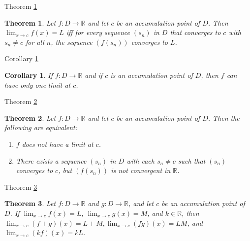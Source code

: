\documentclass[avery5371,grid]{flashcards}
\newtheorem{corollary}{Corollary}
\newtheorem{theorem}{Theorem}
\newcommand{\bb}[1]{\mathbb{#1}}
\newcommand{\R}{\bb{R}}
\begin{document}
\begin{flashcard}[Theorem]{Theorem \ref{thm66}}
\begin{theorem}
\label{thm66}
Let $f: D \to \R$ and let $c$ be an accumulation point of $D$.  Then
$\lim _{x \to c} f(x) = L$ iff for every sequence $(s_n)$ in $D$ that
converges to $c$ with $s_n \not= c$ for all $n$, the sequence $(f(s_n))$
converges to $L$.
\end{theorem}
\end{flashcard}

\begin{flashcard}[Corollary]{Corollary \ref{cor04}}
\begin{corollary}
\label{cor04}
If $f: D \to \R$ and if $c$ is an accumulation point of $D$, then $f$
can have only one limit at $c$.
\end{corollary}
\end{flashcard}

\begin{flashcard}[Theorem]{Theorem \ref{thm67}}
\begin{theorem}
\label{thm67}
Let $f: D \to \R$ and let $c$ be an accumulation point of $D$.  Then the
following are equivalent:
\begin{enumerate}
\item[(a)]  $f$ does not have a limit at $c$.
\item[(b)]  There exists a sequence $(s_n)$ in $D$ with each
$s_n \not= c$ such that $(s_n)$ converges to $c$, but $(f(s_n))$ is not
convergent in $\R$.
\end{enumerate}
\end{theorem}
\end{flashcard}

\begin{flashcard}[Theorem]{Theorem \ref{thm68}}
\begin{theorem}
\label{thm68}
Let $f: D \to \R$ and $g: D \to \R$, and let $c$ be an accumulation
point of $D$.  If $\lim _{x \to c} f(x) = L$, $\lim _{x \to c} g(x) = M$,
and $k \in \R$, then $\lim _{x \to c} (f+g)(x) = L + M, \lim _{x \to c}
(fg)(x) = LM$, and $\lim _{x \to c} (kf)(x) = kL$.
\end{theorem}
\end{flashcard}
\end{document}
